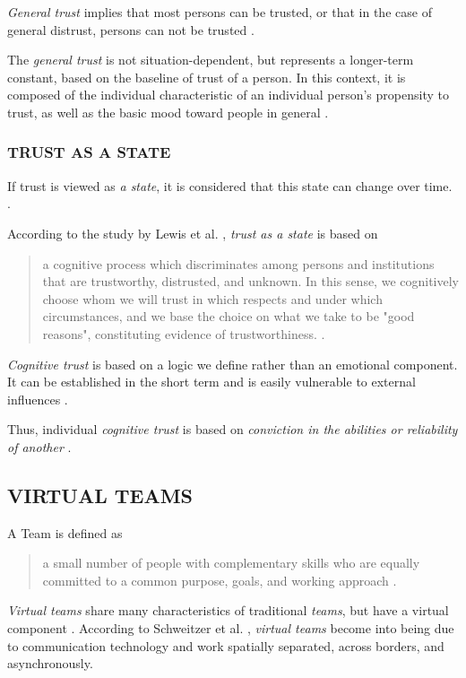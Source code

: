 \documentclass[sigchi]{acmart}
\begin{document}
\textit{General trust} implies that most persons can be trusted, or that in the case of general distrust, persons can not be trusted \citep[p. 409]{stolle2002trusting}.

The \textit{general trust} is not situation-dependent, but represents a longer-term constant, based on the baseline of trust of a person. In this context, it is composed of the individual characteristic of an individual person's propensity to trust, as well as the basic mood toward people in general \citep[p. 11]{couch1996assessment}.

\subsubsection{TRUST AS A STATE}
If trust is viewed as \textit{a state}, it is considered that this state can change over time. \citep[p. 712]{mayer1995integrative}.

According to the study by Lewis et al. \citep[pp. 970-971]{lewis1985trust}, \textit{trust as a state} is based on
\begin{quote} \grqq{}a cognitive process which discriminates among persons and institutions that are trustworthy, distrusted, and unknown. In this sense, we cognitively choose whom we will trust in which respects and under which circumstances, and we base the choice on what we take to be "good reasons", constituting evidence of trustworthiness.\grqq{} \citep[p. 970]{lewis1985trust}.\end{quote}

\textit{Cognitive trust} is based on a logic we define rather than an emotional component. It can be established in the short term and is easily vulnerable to external influences \citep[p. 970]{lewis1985trust}. 

Thus, individual \textit{cognitive trust} is based on \textit{conviction in the abilities or reliability of another} \citep[p. 30]{mcallister1995affect}.

\subsection{VIRTUAL TEAMS}
A Team is defined as \begin{quote}\grqq{}a small number of people with complementary skills who are equally committed to a common purpose, goals, and working approach\grqq{} \citep[p. 2]{zenun2007effects}. \end{quote}

\textit{Virtual teams} share many characteristics of traditional \textit{teams}, but have a virtual component \citep[p. 270]{schweitzer2010conceptualizing}.
According to Schweitzer et al. \citep[p. 270]{schweitzer2010conceptualizing}, \textit{virtual teams} become into being due to communication technology and work spatially separated, across borders, and asynchronously.
\end{document}
